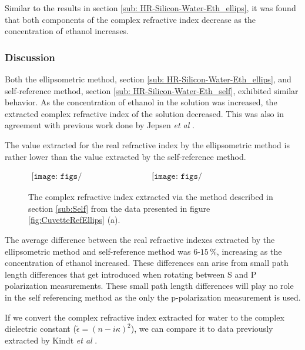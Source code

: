 Similar to the results in section \ref{sub: HR-Silicon-Water-Eth_ellips}, it was found that both components of the complex refractive index decrease as the concentration of ethanol increases.

\subsubsection{Discussion}
\label{sub: 2-LayerDisc}

Both the ellipsometric method, section \ref{sub: HR-Silicon-Water-Eth_ellips}, and self-reference method, section \ref{sub: HR-Silicon-Water-Eth_self}, exhibited similar behavior. As the concentration of ethanol in the solution was increased, the extracted complex refractive index of the solution decreased. This was also in agreement with previous work done by Jepsen \textit{et al} \cite{Jepsen-2007}.

The value extracted for the real refractive index by the ellipsometric method is rather lower than the value extracted by the self-reference method. 

\begin{figure}[H]
                \begin{center}$
								\begin{array}{cc}
                \texttt{[image: figs/n\_Ellips\_2\_layer.png]}&
                \texttt{[image: figs/n\_SelfRefP\_2\_layer.png]}
								\end{array}$
								\end{center}
	\caption[$2$ layer self-reference extracted complex refractive index]{The complex refractive index extracted via the method described in section \ref{sub:Self} from the data presented in figure \ref{fig:CuvetteRefEllips} (a).}
	\label{fig:CuvetteRefSelf}
\end{figure}

The average difference between the real refractive indexes extracted by the ellipsometric method and self-reference method was $6$-$15\,\%$, increasing as the concentration of ethanol increased. These differences can arise from small path length differences that get introduced when rotating between S and P polarization measurements. These small path length differences will play no role in the self referencing method as the only the p-polarization measurement is used.

If we convert the complex refractive index extracted for water to the complex dielectric constant ($\widetilde{\epsilon} = (n - i\kappa)^{2}$), we can compare it to data previously extracted by Kindt \textit{et al} \cite{Kindt1996}.

